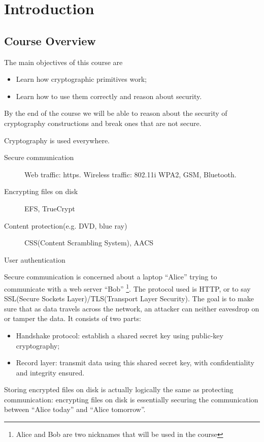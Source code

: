 \ifx\PREAMBLE\undefined


\fi
\chapter{Introduction}
\section{Course Overview}
The main objectives of this course are 
\begin{itemize}
\item Learn how cryptographic primitives work;
\item Learn how to use them correctly and reason about security.
\end{itemize}
By the end of the course we will be able to reason about the security of cryptography constructions and break ones that are not secure. 

Cryptography is used everywhere.
\begin{description}
\item[Secure communication] Web traffic: https. Wireless traffic: 802.11i WPA2, GSM, Bluetooth.
\item[Encrypting files on disk] EFS, TrueCrypt
\item[Content protection(e.g. DVD, blue ray)] CSS(Content Scrambling System), AACS
\item[User authentication]
\end{description}

Secure communication is concerned about a laptop ``Alice'' trying to communicate with a web server ``Bob''
\footnote{Alice and Bob are two nicknames that will be used in the course}. The protocol used is HTTP, or to say SSL(Secure Sockets Layer)/TLS(Transport Layer Security). The goal is to make sure that as data travels across the network, an attacker can neither eavesdrop on or tamper the data. It consists of two parts: 
\begin{itemize}
\item Handshake protocol: establish a shared secret key using public-key cryptography;
\item Record layer: transmit data using this shared secret key, with confidentiality and integrity ensured.
\end{itemize}

Storing encrypted files on disk is actually logically the same as protecting communication: encrypting files on disk is essentially securing the communication between ``Alice today'' and ``Alice tomorrow''. 

